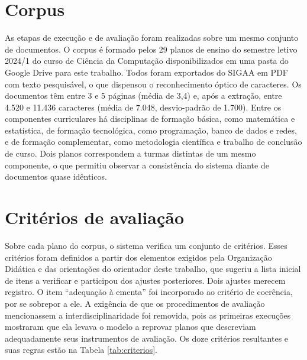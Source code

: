 \section{Corpus}
\label{sec:corpus}

As etapas de execução e de avaliação foram realizadas sobre um mesmo conjunto de documentos. O corpus é formado pelos 29 planos de ensino do semestre letivo 2024/1 do curso de Ciência da Computação disponibilizados em uma pasta do Google Drive para este trabalho. Todos foram exportados do SIGAA em PDF com texto pesquisável, o que dispensou o reconhecimento óptico de caracteres. Os documentos têm entre 3 e 5 páginas (média de 3,4) e, após a extração, entre 4.520 e 11.436 caracteres (média de 7.048, desvio-padrão de 1.700). Entre os componentes curriculares há disciplinas de formação básica, como matemática e estatística, de formação tecnológica, como programação, banco de dados e redes, e de formação complementar, como metodologia científica e trabalho de conclusão de curso. Dois planos correspondem a turmas distintas de um mesmo componente, o que permitiu observar a consistência do sistema diante de documentos quase idênticos.

\section{Critérios de avaliação}
\label{sec:criterios}

Sobre cada plano do corpus, o sistema verifica um conjunto de critérios. Esses critérios foram definidos a partir dos elementos exigidos pela Organização Didática \cite{ifc2022} e das orientações do orientador deste trabalho, que sugeriu a lista inicial de itens a verificar e participou dos ajustes posteriores. Dois ajustes merecem registro. O item ``adequação à ementa'' foi incorporado ao critério de coerência, por se sobrepor a ele. A exigência de que os procedimentos de avaliação mencionassem a interdisciplinaridade foi removida, pois as primeiras execuções mostraram que ela levava o modelo a reprovar planos que descreviam adequadamente seus instrumentos de avaliação. Os doze critérios resultantes e suas regras estão na Tabela \ref{tab:criterios}.

